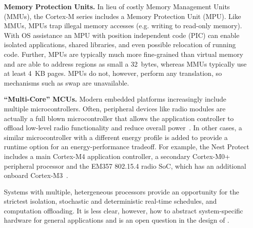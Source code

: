 
{\bf Memory Protection Units.}
In lieu of costly Memory Management Units (MMUs), the Cortex-M series includes
a Memory Protection Unit (MPU). Like MMUs, MPUs trap illegal memory accesses
(e.g. writing to read-only memory).
With OS assistance an MPU
with position independent code (PIC) can enable isolated applications, shared
libraries, and even possible relocation of running code.
Further, MPUs are typically much more fine-grained than
virtual memory and are able to address regions as small a 32~bytes, whereas MMUs
typically use at least 4~KB pages.
MPUs do not, however, perform any translation, so mechanisms such as swap are unavailable.

{\bf ``Multi-Core'' MCUs.}
Modern embedded platforms increasingly include multiple microcontrollers.
Often, peripheral devices like radio modules are actually a full blown
microcontroller that allows the application controller to offload low-level radio
functionality and reduce overall power~\cite{nrf51822,cc2540}. In other cases,
a similar microcontroller with a different energy profile is added to provide
a runtime option for an energy-performance tradeoff.  For example, the Nest
Protect includes a main Cortex-M4 application controller, a secondary
Cortex-M0+ peripheral processor and the EM357 802.15.4 radio SoC, which has an
additional onboard Cortex-M3~\cite{nestprotect-teardown}.



Systems with multiple, hetergeneous processors provide an opportunity for
the strictest isolation, stochastic and deterministic real-time schedules, and
computation offloading. It is less clear, however, how to abstract
system-specific hardware for general applications and is an open question in
the design of \name.


